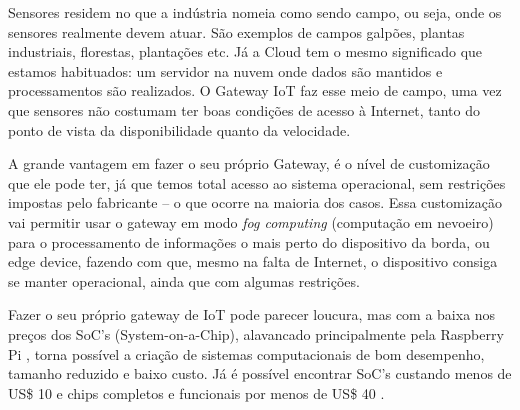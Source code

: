 Sensores residem no que a indústria nomeia como sendo campo, ou seja, onde os sensores realmente devem atuar. São exemplos de campos galpões, plantas industriais, florestas, plantações etc. Já a Cloud tem o mesmo significado que estamos habituados: um servidor na nuvem onde dados são mantidos e processamentos são realizados. O Gateway IoT faz esse meio de campo, uma vez que sensores não costumam ter boas condições de acesso à Internet, tanto do ponto de vista da disponibilidade quanto da velocidade.

A grande vantagem em fazer o seu próprio Gateway, é o nível de customização que ele pode ter, já que temos total acesso ao sistema operacional, sem restrições impostas pelo fabricante – o que ocorre na maioria dos casos. Essa customização vai permitir usar o gateway em modo \textit{fog computing} (computação em nevoeiro) para o processamento de informações o mais perto do dispositivo da borda, ou edge device, fazendo com que, mesmo na falta de Internet, o dispositivo consiga se manter operacional, ainda que com algumas restrições.

Fazer o seu próprio gateway de IoT pode parecer loucura, mas com a baixa nos preços dos SoC’s (System-on-a-Chip), alavancado principalmente pela Raspberry Pi \cite{RaspberryPi}, torna possível a criação de sistemas computacionais de bom desempenho, tamanho reduzido e baixo custo. Já é possível encontrar SoC’s custando menos de US\$ 10 e chips completos e funcionais por menos de US\$ 40 \cite{RaspberryPiVenda}.